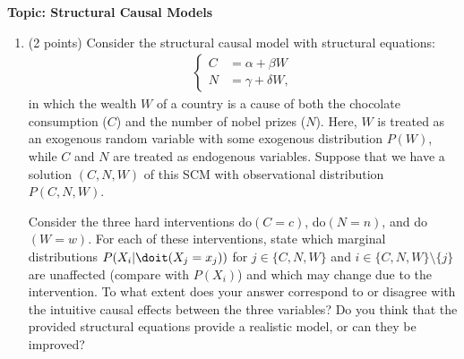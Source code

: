 

\flushleft\textbf{Topic: Structural Causal Models}

\begin{enumerate}
\item (2 points) Consider the structural causal model with structural equations:
\begin{align*}
  \begin{cases}
    C & = \alpha + \beta W \\
    N & = \gamma + \delta W,
  \end{cases}
\end{align*}
in which the wealth $W$ of a country is a cause of both the chocolate consumption ($C$) and the number of nobel prizes ($N$).
Here, $W$ is treated as an exogenous random variable with some exogenous distribution $P(W)$, while $C$ and $N$ are treated as endogenous variables. Suppose that we have a solution $(C, N, W)$ of this SCM with observational distribution $P(C, N, W)$.


Consider the three hard interventions do$(C = c)$, do$(N = n)$, and do$(W = w)$. For each of these interventions, state which marginal distributions $P(X_i |\doit(X_j=x_j))$ for $j \in \{C, N, W\}$ and $i\in \{C, N, W\}\setminus \{j\}$ are unaffected (compare with $P(X_i)$) and which may change due to the intervention. To what extent does your answer correspond to or disagree with the intuitive causal effects between the three variables? Do you think that the provided structural equations provide a realistic model, or can they be improved?


\end{enumerate}
